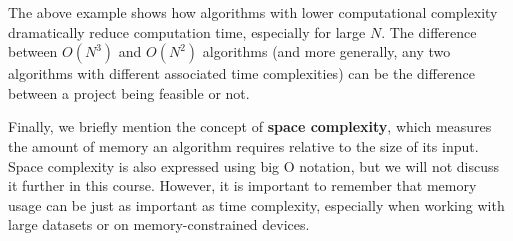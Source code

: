 The above example shows how algorithms with lower computational complexity dramatically reduce computation time, especially for large $N$. The difference between $O(N^3)$ and $O(N^2)$ algorithms (and more generally, any two algorithms with different associated time complexities) can be the difference between a project being feasible or not.

Finally, we briefly mention the concept of \textbf{space complexity}, which measures the amount of memory an algorithm requires relative to the size of its input. Space complexity is also expressed using big O notation, but we will not discuss it further in this course. However, it is important to remember that memory usage can be just as important as time complexity, especially when working with large datasets or on memory-constrained devices.
